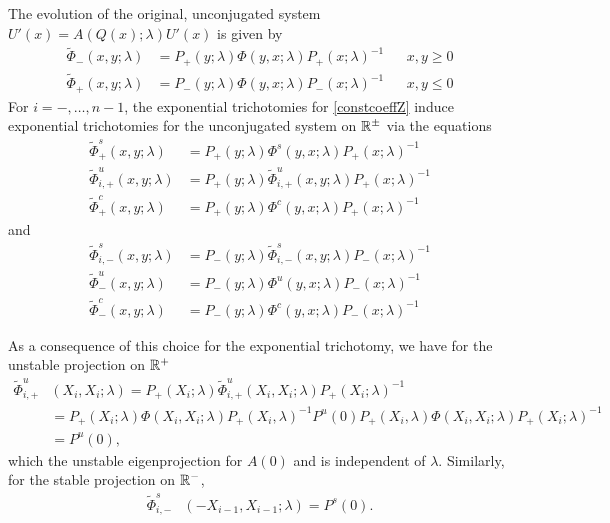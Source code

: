 \documentclass[thesis.tex]{subfiles}
\begin{document}
The evolution of the original, unconjugated system $U'(x) = A(Q(x); \lambda) U'(x)$ is given by
\begin{equation}
\begin{aligned}
\tilde{\Phi}_-(x, y; \lambda) &= P_+(y; \lambda) \Phi(y, x; \lambda) P_+(x; \lambda)^{-1} && x, y \geq 0  \\
\tilde{\Phi}_+(x, y; \lambda) &= P_-(y; \lambda) \Phi(y, x; \lambda) P_-(x; \lambda)^{-1} && x, y \leq 0
\end{aligned}
\end{equation}
For $i = -, \dots, n-1$, the exponential trichotomies for \cref{constcoeffZ} induce exponential trichotomies for the unconjugated system on $\mathbb{R}^\pm$ via the equations
\begin{equation}\label{trichunconjplus}
\begin{aligned}
\tilde{\Phi}_+^{s}(x, y; \lambda) &= P_+(y; \lambda) \Phi^{s}(y, x; \lambda) P_+(x; \lambda)^{-1} \\
\tilde{\Phi}_{i,+}^{u}(x, y; \lambda) &= P_+(y; \lambda) \tilde{\Phi}_{i,+}^{u}(x, y; \lambda) P_+(x; \lambda)^{-1} \\
\tilde{\Phi}_+^{c}(x, y; \lambda) &= P_+(y; \lambda) \Phi^{c}(y, x; \lambda) P_+(x; \lambda)^{-1}
\end{aligned}
\end{equation}
and
\begin{equation}\label{trichunconjminus}
\begin{aligned}
\tilde{\Phi}_{i,-}^{s}(x, y; \lambda) &= P_-(y; \lambda) \tilde{\Phi}_{i,-}^{s}(x, y; \lambda) P_-(x; \lambda)^{-1} \\
\tilde{\Phi}_-^{u}(x, y; \lambda) &= P_-(y; \lambda) \Phi^{u}(y, x; \lambda) P_-(x; \lambda)^{-1} \\
\tilde{\Phi}_-^{c}(x, y; \lambda) &= P_-(y; \lambda) \Phi^{c}(y, x; \lambda) P_-(x; \lambda)^{-1}
\end{aligned}
\end{equation}

As a consequence of this choice for the exponential trichotomy, we have for the unstable projection on $\mathbb{R}^+$
\begin{align*}
\tilde{\Phi}_{i,+}^{u}&(X_i, X_i ; \lambda) = P_+(X_i; \lambda) \tilde{\Phi}_{i,+}^{u}(X_i, X_i; \lambda) P_+(X_i; \lambda)^{-1} \\
&= P_+(X_i; \lambda) \Phi(X_i, X_i; \lambda) P_+(X_i, \lambda)^{-1}
P^u(0) P_+(X_i, \lambda) \Phi(X_i, X_i; \lambda) P_+(X_i; \lambda)^{-1} \\
&= P^u(0),
\end{align*}
which the unstable eigenprojection for $A(0)$ and is independent of $\lambda$. Similarly, for the stable projection on $\mathbb{R}^-$,
\begin{align*}
\tilde{\Phi}_{i,-}^{s}&(-X_{i-1}, X_{i-1} ; \lambda) = P^s(0).
\end{align*}
\end{document}
